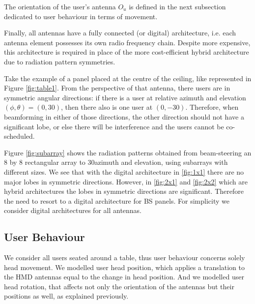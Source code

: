 
The orientation of the user's antenna $O_{u}$ is defined in the next subsection dedicated to user behaviour in terms of movement.

Finally, all antennas have a fully connected (or digital) architecture, i.e. each antenna element possesses its own radio frequency chain. Despite more expensive, this architecture is required in place of the more cost-efficient hybrid architecture due to radiation pattern symmetries.

Take the example of a panel placed at the centre of the ceiling, like represented in Figure \ref{fig:table1}. From the perspective of that antenna, there users are in symmetric angular directions: if there is a user at relative azimuth and elevation $(\phi, \theta) = (0, 30)$, then there also is one user at $(0, -30)$. Therefore, when beamforming in either of those directions, the other direction should not have a significant lobe, or else there will be interference and the users cannot be co-scheduled. 

Figure \ref{fig:subarray} shows the radiation patterns obtained from beam-steering an 8 by 8 rectangular array to 30\tdeg azimuth and \tdeg elevation, using subarrays with different sizes. We see that with the digital architecture in \ref{fig:1x1} there are no major lobes in symmetric directions. However, in \ref{fig:2x1} and \ref{fig:2x2} which are hybrid architectures the lobes in symmetric directions are significant. Therefore the need to resort to a digital architecture for \ac{BS} panels. For simplicity we consider digital architectures for all antennas.



\subsection{User Behaviour}

We consider all users seated around a table, thus user behaviour concerns solely head movement. We modelled user head position, which applies a translation to the \ac{HMD} antennas equal to the change in head position. And we modelled user head rotation, that affects not only the orientation of the antennas but their positions as well, as explained previously.


